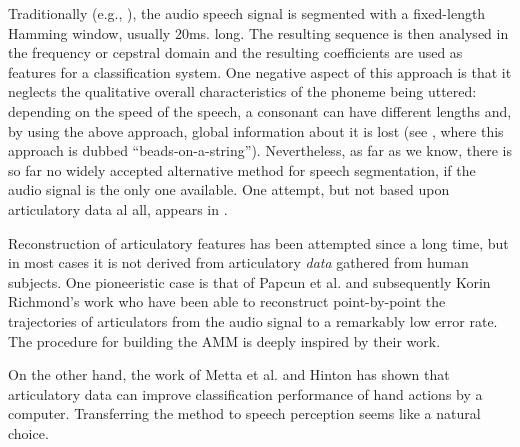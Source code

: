 Traditionally (e.g., \cite{bourl,salvi}), the audio speech signal is segmented with a
fixed-length Hamming window, usually 20ms. long. The resulting sequence
is then analysed in the frequency or cepstral domain and the
resulting coefficients are used as features for a classification system.
One negative aspect of this approach is that it
neglects the qualitative overall characteristics of the
phoneme being uttered: depending on the speed of the speech, a consonant
can have different lengths and, by using the above approach, global
information about it is lost (see \cite{ostendorf}, where this approach is
dubbed ``beads-on-a-string''). Nevertheless, as far as we know, there is
so far no widely accepted alternative method for speech segmentation,
if the audio signal is the only one available. One attempt, but not based
upon articulatory data al all, appears in \cite{bourlard}.

Reconstruction of articulatory features has been attempted since a long
time, but in most cases it is not derived from articulatory \emph{data}
gathered from human subjects. One pioneeristic case is that of Papcun
et al. \cite{papcun} and subsequently Korin Richmond's work
\cite{richmond2002,richmond2007} who have been able to reconstruct point-by-point
the trajectories of articulators from the audio signal to a remarkably low
error rate. The procedure for building the AMM is deeply inspired by their
work.

On the other hand, the work of Metta et al. \cite{metta-06} and Hinton \cite{hinton-2006} 
has shown that articulatory data can improve classification performance of 
hand actions by a computer. Transferring the method to speech perception seems
like a natural choice.
